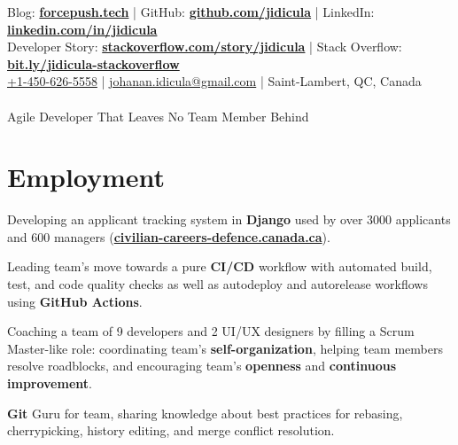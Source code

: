 \documentclass[]{jidicula-resume}
\begin{document}
\livelocation\hfill\lastupdated

{ Blog: \href{http://bit.ly/jidicula-site}{\bf forcepush.tech}
  | GitHub: \href{http://bit.ly/jidicula_github}{\bf github.com/jidicula} | LinkedIn: \href{https://bit.ly/jidicula-linkedin}{\bf linkedin.com/in/jidicula} \\
  Developer Story: \href{https://stackoverflow.com/story/jidicula}{\bf stackoverflow.com/story/jidicula} | Stack Overflow: \href{https://bit.ly/jidicula-stackoverflow}{\bf bit.ly/jidicula-stackoverflow} \\
  \href{tel:14506265558}{+1-450-626-5558}
  | \href{mailto:johanan.idicula+resume@gmail.com}{johanan.idicula@gmail.com}
  | Saint-Lambert, QC, Canada \\~\\
{\Large Agile Developer That Leaves No Team Member Behind}
}

\section{Employment}

\vspace{\topsep} %
\begin{tightemize}
\item Developing an applicant tracking system in \textbf{Django} used by over 3000 applicants and 600 managers (\href{https://civilian-careers-defence.canada.ca}{\bf civilian-careers-defence.canada.ca}).
\item Leading team's move towards a pure \textbf{CI/CD} workflow with automated build, test, and code quality checks as well as autodeploy and autorelease workflows using \textbf{GitHub Actions}.
\item Coaching a team of 9 developers and 2 UI/UX designers by filling a Scrum Master-like role: coordinating team's \textbf{self-organization}, helping team members resolve roadblocks, and encouraging team's \textbf{openness} and \textbf{continuous improvement}.
\item \textbf{Git} Guru for team, sharing knowledge about best practices for rebasing, cherrypicking, history editing, and merge conflict resolution.
\end{tightemize}
\sectionsep{}
\end{document}
